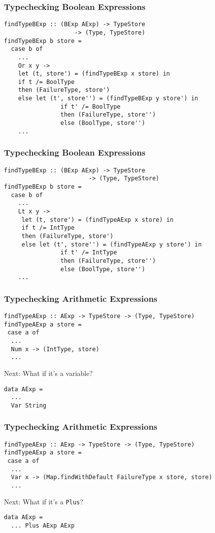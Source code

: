 \documentclass{beamer}
\begin{document}
\begin{frame}[fragile]
\frametitle{Typechecking Boolean Expressions}
\begin{verbatim}
findTypeBExp :: (BExp AExp) -> TypeStore 
                    -> (Type, TypeStore)
findTypeBExp b store =
  case b of
    ...
    Or x y -> 
    let (t, store') = (findTypeBExp x store) in
    if t /= BoolType
    then (FailureType, store')
    else let (t', store'') = (findTypeBExp y store') in
                if t' /= BoolType
                then (FailureType, store'')
                else (BoolType, store'')
    ...
\end{verbatim}
\end{frame}

\begin{frame}[fragile]
\frametitle{Typechecking Boolean Expressions}
\begin{verbatim}
findTypeBExp :: (BExp AExp) -> TypeStore 
                        -> (Type, TypeStore)
findTypeBExp b store =
  case b of
    ...
    Lt x y ->
     let (t, store') = (findTypeAExp x store) in
     if t /= IntType
     then (FailureType, store')
     else let (t', store'') = (findTypeAExp y store') in
                if t' /= IntType
                then (FailureType, store'')
                else (BoolType, store'')
    ...
\end{verbatim}
\end{frame}

\begin{frame}[fragile]
\frametitle{Typechecking Arithmetic Expressions}
\begin{verbatim}
findTypeAExp :: AExp -> TypeStore -> (Type, TypeStore)
findTypeAExp a store =
 case a of
  ...
  Num x -> (IntType, store)
  ...
\end{verbatim}

\vfill
\pause
Next: What if it's a variable?
\begin{verbatim}
data AExp =
  ...
  Var String
\end{verbatim}
\end{frame}

\begin{frame}[fragile]
\frametitle{Typechecking Arithmetic Expressions}
\begin{verbatim}
findTypeAExp :: AExp -> TypeStore -> (Type, TypeStore)
findTypeAExp a store =
 case a of
  ...
  Var x -> (Map.findWithDefault FailureType x store, store)
  ...
\end{verbatim}


\vfill
\pause

Next: What if it's a {\tt Plus}?
\begin{verbatim}
data AExp =
  ... Plus AExp AExp
\end{verbatim}
\end{frame}
\end{document}
